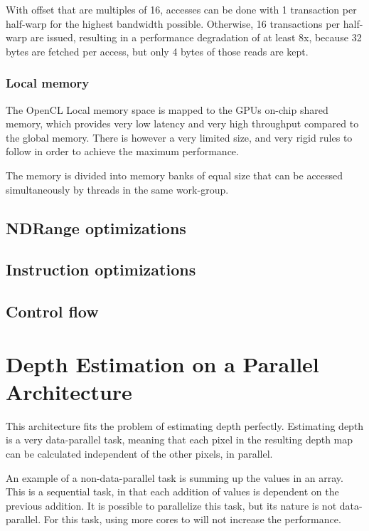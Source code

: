 With offset that are multiples of 16, accesses can be done with 1
transaction per half-warp for the highest bandwidth possible.
Otherwise, 16 transactions per half-warp are issued, resulting in a
performance degradation of at least 8x, because 32 bytes are fetched
per access, but only 4 bytes of those reads are kept.

\subsubsection{Local memory}
\label{sect:local-mem-optimization}

The OpenCL Local memory space is mapped to the GPUs on-chip shared
memory, which provides very low latency and very high throughput
compared to the global memory. There is however a very limited size,
and very rigid rules to follow in order to achieve the maximum
performance.

The memory is divided into memory banks of equal size that can be
accessed simultaneously by threads in the same work-group.

\subsection{NDRange optimizations}
\label{sect:ndrange-optimization}



\subsection{Instruction optimizations}
\label{sect:instruction-optimization}

\subsection{Control flow}
\label{sect:control-flow}

\section{Depth Estimation on a Parallel Architecture}

This architecture fits the problem of estimating depth perfectly.
Estimating depth is a very data-parallel task, meaning that each pixel
in the resulting depth map can be calculated independent of the other
pixels, in parallel.

An example of a non-data-parallel task is summing up the values in an
array. This is a sequential task, in that each addition of values is
dependent on the previous addition. It is possible to parallelize this
task, but its nature is not data-parallel. For this task, using more
cores to will not increase the performance.


